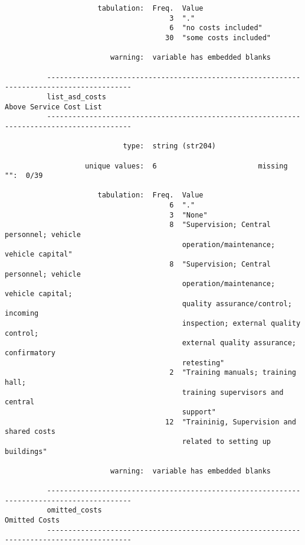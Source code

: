 \documentclass{article}
\begin{document}
\begin{verbatim}
                      tabulation:  Freq.  Value
                                       3  "."
                                       6  "no costs included"
                                      30  "some costs included"
          
                         warning:  variable has embedded blanks
          
          ------------------------------------------------------------------------------------------
          list_asd_costs                                                     Above Service Cost List
          ------------------------------------------------------------------------------------------
          
                            type:  string (str204)
          
                   unique values:  6                        missing "":  0/39
          
                      tabulation:  Freq.  Value
                                       6  "."
                                       3  "None"
                                       8  "Supervision; Central personnel; vehicle
                                          operation/maintenance; vehicle capital"
                                       8  "Supervision; Central personnel; vehicle
                                          operation/maintenance; vehicle capital;
                                          quality assurance/control; incoming
                                          inspection; external quality control;
                                          external quality assurance; confirmatory
                                          retesting"
                                       2  "Training manuals; training hall;
                                          training supervisors and central
                                          support"
                                      12  "Traininig, Supervision and shared costs
                                          related to setting up buildings"
          
                         warning:  variable has embedded blanks
          
          ------------------------------------------------------------------------------------------
          omitted_costs                                                                Omitted Costs
          ------------------------------------------------------------------------------------------
          

\end{verbatim}
\end{document}
